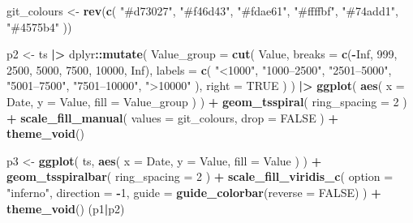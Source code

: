 \documentclass[10pt,a4paper,onecolumn]{article}
\newenvironment{Shaded}{\begin{snugshade}}{\end{snugshade}}
\newcommand{\AttributeTok}[1]{\textcolor[rgb]{0.13,0.29,0.53}{#1}}
\newcommand{\ConstantTok}[1]{\textcolor[rgb]{0.56,0.35,0.01}{#1}}
\newcommand{\DecValTok}[1]{\textcolor[rgb]{0.00,0.00,0.81}{#1}}
\newcommand{\FunctionTok}[1]{\textcolor[rgb]{0.13,0.29,0.53}{\textbf{#1}}}
\newcommand{\NormalTok}[1]{#1}
\newcommand{\OtherTok}[1]{\textcolor[rgb]{0.56,0.35,0.01}{#1}}
\newcommand{\SpecialCharTok}[1]{\textcolor[rgb]{0.81,0.36,0.00}{\textbf{#1}}}
\newcommand{\StringTok}[1]{\textcolor[rgb]{0.31,0.60,0.02}{#1}}
\begin{document}
\begin{Shaded}
\begin{Highlighting}[]
\NormalTok{git\_colours }\OtherTok{\textless{}{-}} \FunctionTok{rev}\NormalTok{(}\FunctionTok{c}\NormalTok{(}
  \StringTok{"\#d73027"}\NormalTok{,}
  \StringTok{"\#f46d43"}\NormalTok{,}
  \StringTok{"\#fdae61"}\NormalTok{,}
  \StringTok{"\#ffffbf"}\NormalTok{,}
  \StringTok{"\#74add1"}\NormalTok{,}
  \StringTok{"\#4575b4"}
\NormalTok{))}

\NormalTok{p2 }\OtherTok{\textless{}{-}}\NormalTok{ ts }\SpecialCharTok{|\textgreater{}}
\NormalTok{  dplyr}\SpecialCharTok{::}\FunctionTok{mutate}\NormalTok{(}
    \AttributeTok{Value\_group =} \FunctionTok{cut}\NormalTok{(}
\NormalTok{      Value,}
      \AttributeTok{breaks =} \FunctionTok{c}\NormalTok{(}\SpecialCharTok{{-}}\ConstantTok{Inf}\NormalTok{, }\DecValTok{999}\NormalTok{, }\DecValTok{2500}\NormalTok{, }\DecValTok{5000}\NormalTok{, }\DecValTok{7500}\NormalTok{, }\DecValTok{10000}\NormalTok{, }\ConstantTok{Inf}\NormalTok{),}
      \AttributeTok{labels =} \FunctionTok{c}\NormalTok{(}
        \StringTok{"\textless{}1000"}\NormalTok{,}
        \StringTok{"1000–2500"}\NormalTok{,}
        \StringTok{"2501–5000"}\NormalTok{,}
        \StringTok{"5001–7500"}\NormalTok{,}
        \StringTok{"7501–10000"}\NormalTok{,}
        \StringTok{"\textgreater{}10000"}
\NormalTok{      ),}
      \AttributeTok{right =} \ConstantTok{TRUE}
\NormalTok{    )}
\NormalTok{  ) }\SpecialCharTok{|\textgreater{}}
  \FunctionTok{ggplot}\NormalTok{(}
    \FunctionTok{aes}\NormalTok{(}
      \AttributeTok{x =}\NormalTok{ Date,}
      \AttributeTok{y =}\NormalTok{ Value,}
      \AttributeTok{fill =}\NormalTok{ Value\_group}
\NormalTok{    )}
\NormalTok{  ) }\SpecialCharTok{+}
  \FunctionTok{geom\_tsspiral}\NormalTok{(}
    \AttributeTok{ring\_spacing =} \DecValTok{2}
\NormalTok{  ) }\SpecialCharTok{+}
  \FunctionTok{scale\_fill\_manual}\NormalTok{(}
    \AttributeTok{values =}\NormalTok{ git\_colours,}
    \AttributeTok{drop =} \ConstantTok{FALSE}
\NormalTok{  ) }\SpecialCharTok{+}
  \FunctionTok{theme\_void}\NormalTok{()}

\NormalTok{p3 }\OtherTok{\textless{}{-}} \FunctionTok{ggplot}\NormalTok{(}
\NormalTok{  ts,}
  \FunctionTok{aes}\NormalTok{(}
    \AttributeTok{x =}\NormalTok{ Date,}
    \AttributeTok{y =}\NormalTok{ Value,}
    \AttributeTok{fill =}\NormalTok{ Value}
\NormalTok{  )}
\NormalTok{) }\SpecialCharTok{+}
  \FunctionTok{geom\_tsspiralbar}\NormalTok{(}
    \AttributeTok{ring\_spacing =} \DecValTok{2}
\NormalTok{  ) }\SpecialCharTok{+}
  \FunctionTok{scale\_fill\_viridis\_c}\NormalTok{(}
    \AttributeTok{option =} \StringTok{"inferno"}\NormalTok{,}
    \AttributeTok{direction =} \SpecialCharTok{{-}}\DecValTok{1}\NormalTok{,}
    \AttributeTok{guide =} \FunctionTok{guide\_colorbar}\NormalTok{(}\AttributeTok{reverse =} \ConstantTok{FALSE}\NormalTok{)}
\NormalTok{  ) }\SpecialCharTok{+}
  \FunctionTok{theme\_void}\NormalTok{()}
\NormalTok{(p1}\SpecialCharTok{|}\NormalTok{p2)}
\end{Highlighting}
\end{Shaded}
\end{document}
